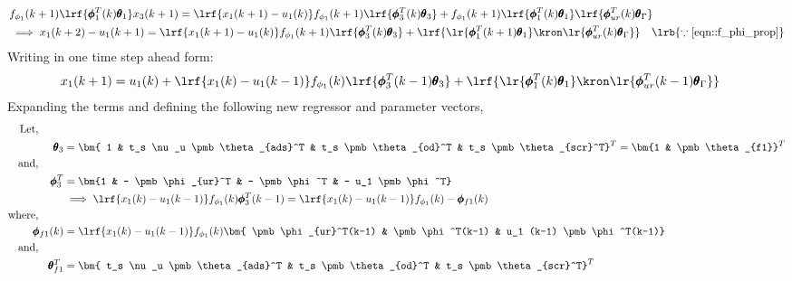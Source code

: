 \begin{align*}
      &f_{\phi_1}(k+1) \lrf{\pmb \phi_1^T(k) \pmb \theta_1} x_3(k+1)
                = \lrf{{x_1(k+1) - u_1(k)}} f_{\phi_1}(k+1)\lrf{\pmb \phi_3^T (k) \pmb \theta_3}
                + f_{\phi_1}(k+1)\lrf{\pmb \phi_1^T(k) \pmb \theta_1} \lrf{\pmb \phi^T_{ur}(k) \pmb \theta_\Gamma}\\
      &\implies {x_1(k+2) - u_1(k+1)} = \lrf{{x_1(k+1) - u_1(k)}} f_{\phi_1}(k+1)\lrf{\pmb \phi_3^T (k) \pmb \theta_3}
                + \lrf{ \lr{\pmb \phi_1^T(k+1) \pmb \theta_1} \kron \lr{\pmb \phi^T_{ur}(k) \pmb \theta_\Gamma}}
        \quad \lrb{\because \ref{eqn::f_phi_prop}}
\end{align*}
Writing in one time step ahead form:
\begin{align}
        x_1(k+1) &=  u_1(k)  +
                     \lrf{{x_1(k) - u_1(k-1)}} f_{\phi_1}(k)\lrf{\pmb \phi_3^T (k-1) \pmb \theta_3}+
                     \lrf{ \lr{\pmb \phi_1^T(k) \pmb \theta_1} \kron \lr{\pmb \phi^T_{ur}(k-1) \pmb \theta_\Gamma}}
        \label{eqn::r_nox_2}
\end{align}
Expanding the terms and defining the following new regressor and parameter vectors,
\begin{align*}
        \text{Let, } \qquad &\\
        \pmb \theta_3 &= \bm{ 1 &
                                t_s \nu_u \pmb \theta_{ads}^T &
                                t_s \pmb \theta_{od}^T        &
                                t_s \pmb \theta_{scr}^T} ^T
                        = \bm{1 & \pmb \theta_{f1}}^T\\
        \text{and, } \qquad &\\
        \pmb \phi_3^T &= \bm{1 &
                   - \pmb \phi_{ur}^T &
                   - \pmb \phi^T  &
                   - u_1 \pmb \phi^T}   \\
        &\implies \lrf{{x_1(k) - u_1(k-1)}} f_{\phi_1}(k) \pmb \phi_3^T (k-1)  = \lrf{{x_1(k) - u_1(k-1)}} f_{\phi_1}(k) - \pmb \phi_{f1}(k)\\
        \text{where, } \qquad &\\
        \pmb \phi_{f1}(k)
                &= \lrf{{x_1(k) - u_1(k-1)}} f_{\phi_1}(k)
                \bm{ \pmb \phi_{ur}^T(k-1) &
                    \pmb \phi^T(k-1)  &
                    u_1 (k-1) \pmb \phi^T(k-1)}   \\
        \text{and, } \qquad &\\
        \pmb \theta_{f1}^T &= \bm{ t_s \nu_u \pmb \theta_{ads}^T &
                                t_s \pmb \theta_{od}^T        &
                                t_s \pmb \theta_{scr}^T} ^T
\end{align*}

